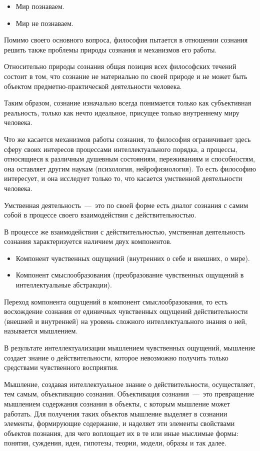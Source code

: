 \documentclass[14pt]{extarticle}
\begin{document}
\begin{itemize}
	\item Мир познаваем.
	\item Мир не познаваем.
\end{itemize}

Помимо своего основного вопроса, философия пытается в отношении сознания решить также проблемы природы сознания и механизмов его работы.

Относительно природы сознания общая позиция всех философских течений состоит в том, что сознание не материально по своей природе и не может быть объектом предметно-практической деятельности человека.

Таким образом, сознание изначально всегда понимается только как субъективная реальность, только как нечто идеальное, присущее только внутреннему миру человека.

Что же касается механизмов работы сознания, то философия ограничивает здесь сферу своих интересов процессами интеллектуального порядка, а процессы, относящиеся к различным душевным состояниям, переживаниям и способностям, она оставляет другим наукам (психология, нейрофизиология). То есть философию интересует, и она исследует только то, что касается умственной деятельности человека.

Умственная деятельность~---~это по своей форме есть диалог сознания с самим собой в процессе своего взаимодействия с действительностью.

В процессе же взаимодействия с действительностью, умственная деятельность сознания характеризуется наличием двух компонентов.

\begin{itemize}
	\item Компонент чувственных ощущений (внутренних о себе и внешних, о мире).
	\item Компонент смыслообразования (преобразование чувственных ощущений в интеллектуальные абстракции).
\end{itemize}

Переход компонента ощущений в компонент смыслообразования, то есть восхождение сознания от единичных чувственных ощущений действительности (внешней и внутренней) на уровень сложного интеллектуального знания о ней, называется мышлением.

В результате интеллектуализации мышлением чувственных ощущений, мышление создает знание о действительности, которое невозможно получить только средствами чувственного восприятия.

Мышление, создавая интеллектуальное знание о действительности, осуществляет, тем самым, объективацию сознания. Объективация сознания~---~это превращение мышлением содержания сознания в объекты, с которым мышление может работать. Для получения таких объектов мышление выделяет в сознании элементы, формирующие содержание, и наделяет эти элементы свойствами объектов познания, для чего воплощает их в те или иные мыслимые формы: понятия, суждения, идеи, гипотезы, теории, модели, образы и так далее.
\end{document}
